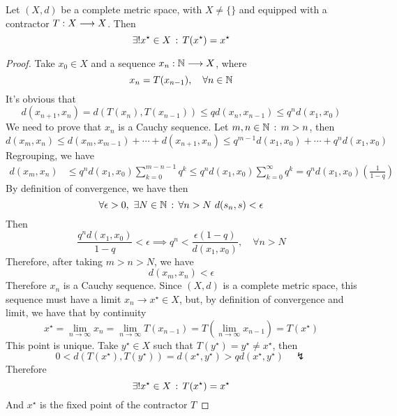 \documentclass[../complete.tex]{subfiles}
\begin{document}
\begin{thm}
	Let $(X,d)$ be a complete metric space, with $X\ne\{\}$ and equipped with a contractor $T:X\overset{}{\longrightarrow} X$. Then
	\begin{equation}
		\exists!x^{\star}\in X\, :\,  T(x^\star)=x^\star
		\label{eq:fixedpointbanach}
	\end{equation}
\end{thm}
\begin{proof}
	Take $x_0\in X$ and a sequence $x_n:\mathbb{N}\overset{}{\longrightarrow} X$, where
	\begin{equation*}
		x_n=T(x_{n-1}),\quad\forall n\in\mathbb{N}
	\end{equation*}
	It's obvious that
	\begin{equation*}
		d(x_{n+1},x_{n})=d(T(x_{n}),T(x_{n-1}))\le qd(x_n,x_{n-1})\le q^nd(x_1,x_0)
	\end{equation*}
	We need to prove that $x_n$ is a Cauchy sequence. Let $m,n\in\mathbb{N}\, :\,  m>n$, then
	\begin{equation*}
		d(x_m,x_n)\le d(x_m,x_{m-1})+\cdots+d(x_{n+1},x_n)\le q^{m-1}d(x_1,x_0)+\cdots+q^nd(x_1,x_0)
	\end{equation*}
	Regrouping, we have
	\begin{equation*}
		\begin{aligned}
			d(x_m,x_n)&\le q^nd(x_1,x_0)\sum_{k=0}^{m-n-1}q^k\le q^nd(x_1,x_0)\sum_{k=0}^{\infty}q^k=q^nd(x_1,x_0)\left( \frac{1}{1-q} \right)
		\end{aligned}
	\end{equation*}
	By definition of convergence, we have then
	\begin{equation*}
		\forall\epsilon>0,\ \exists N\in\mathbb{N}\, :\, \forall n>N\ d(s_n,s)<\epsilon
	\end{equation*}
	Then
	\begin{equation*}
		\frac{q^nd(x_1,x_0)}{1-q}<\epsilon\implies q^n<\frac{\epsilon(1-q)}{d(x_1,x_0)},\quad\forall n>N
	\end{equation*}
	Therefore, after taking $m>n>N$, we have
	\begin{equation*}
		d(x_m,x_n)<\epsilon
	\end{equation*}
	Therefore $x_n$ is a Cauchy sequence. Since $(X,d)$ is a complete metric space, this sequence must have a limit $x_n\to x^\star\in X$, but, by definition of convergence and limit, we have that by continuity
	\begin{equation*}
		x^\star=\lim_{n\to\infty}x_n=\lim_{n\to\infty}T(x_{n-1})=T\left( \lim_{n\to\infty}x_{n-1} \right)=T(x^\star)
	\end{equation*}
	This point is unique. Take $y^\star\in X$ such that $T(y^\star)=y^\star\ne x^\star$, then
	\begin{equation*}
		0<d(T(x^\star),T(y^\star))=d(x^\star,y^\star)>qd(x^\star,y^\star)\quad\lightning
	\end{equation*}
	Therefore
	\begin{equation*}
		\exists!x^\star\in X\, :\,  T(x^\star)=x^\star
	\end{equation*}
	And $x^\star$ is the fixed point of the contractor $T$
\end{proof}
\end{document}

